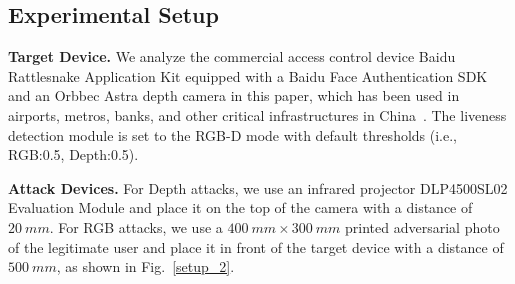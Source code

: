 \begin{table}[pt]
	\caption{Attack Effectiveness of \texttt{DepthFake} on a Commercial Access Control Device}
	\begin{center}
		\label{commercial_asr}
	\end{center}
	\vspace{-0.15in}
\end{table}

\subsection{Experimental Setup}
\textbf{Target Device.} We analyze the commercial access control device Baidu Rattlesnake Application Kit equipped with a Baidu Face Authentication SDK and an Orbbec Astra depth camera in this paper, which has been used in airports, metros, banks, and other critical infrastructures in China~\cite{baidu_customer}.
The liveness detection module is set to the RGB-D mode with default thresholds  (i.e., RGB:0.5, Depth:0.5).

\textbf{Attack Devices.} For Depth attacks, we use an infrared projector DLP4500SL02 Evaluation Module and place it on the top of the camera with a distance of $20~mm$. For RGB attacks, we use a $400~mm\times300~mm$ printed adversarial photo of the legitimate user and place it in front of the target device with a distance of $500~mm$, as shown in Fig.~\ref{setup_2}.


